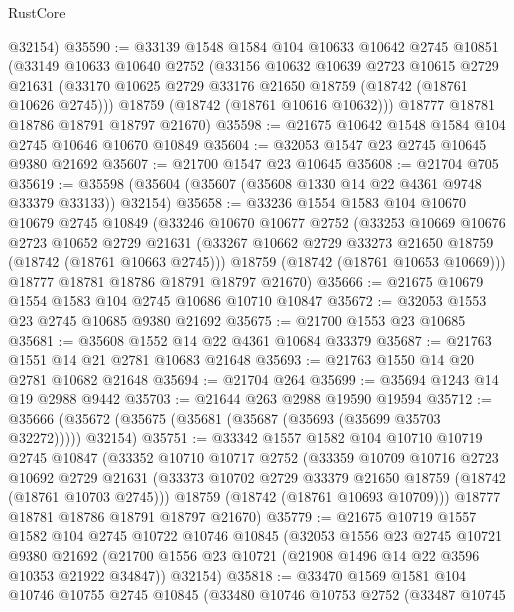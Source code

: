 \begin{lexlean}{RustCore}
\begin{coremodule}
      @32154)
@35590 := @33139
    @1548
    @1584
    @104
    @10633
    @10642
    @2745
    @10851
    (@33149
      @10633
      @10640
      @2752
      (@33156
        @10632
        @10639
        @2723
        @10615
        @2729
        @21631
        (@33170 @10625 @2729 @33176 @21650 @18759 (@18742 (@18761 @10626 @2745)))
        @18759
        (@18742 (@18761 @10616 @10632)))
      @18777
      @18781
      @18786
      @18791
      @18797
      @21670)
@35598 := @21675 @10642 @1548 @1584 @104 @2745 @10646 @10670 @10849
@35604 := @32053 @1547 @23 @2745 @10645 @9380 @21692
@35607 := @21700 @1547 @23 @10645
@35608 := @21704 @705
@35619 := @35598 (@35604 (@35607 (@35608 @1330 @14 @22 @4361 @9748 @33379 @33133)) @32154)
@35658 := @33236
    @1554
    @1583
    @104
    @10670
    @10679
    @2745
    @10849
    (@33246
      @10670
      @10677
      @2752
      (@33253
        @10669
        @10676
        @2723
        @10652
        @2729
        @21631
        (@33267 @10662 @2729 @33273 @21650 @18759 (@18742 (@18761 @10663 @2745)))
        @18759
        (@18742 (@18761 @10653 @10669)))
      @18777
      @18781
      @18786
      @18791
      @18797
      @21670)
@35666 := @21675 @10679 @1554 @1583 @104 @2745 @10686 @10710 @10847
@35672 := @32053 @1553 @23 @2745 @10685 @9380 @21692
@35675 := @21700 @1553 @23 @10685
@35681 := @35608 @1552 @14 @22 @4361 @10684 @33379
@35687 := @21763 @1551 @14 @21 @2781 @10683 @21648
@35693 := @21763 @1550 @14 @20 @2781 @10682 @21648
@35694 := @21704 @264
@35699 := @35694 @1243 @14 @19 @2988 @9442
@35703 := @21644 @263 @2988 @19590 @19594
@35712 := @35666 (@35672 (@35675 (@35681 (@35687 (@35693 (@35699 @35703 @32272))))) @32154)
@35751 := @33342
    @1557
    @1582
    @104
    @10710
    @10719
    @2745
    @10847
    (@33352
      @10710
      @10717
      @2752
      (@33359
        @10709
        @10716
        @2723
        @10692
        @2729
        @21631
        (@33373 @10702 @2729 @33379 @21650 @18759 (@18742 (@18761 @10703 @2745)))
        @18759
        (@18742 (@18761 @10693 @10709)))
      @18777
      @18781
      @18786
      @18791
      @18797
      @21670)
@35779 := @21675
    @10719
    @1557
    @1582
    @104
    @2745
    @10722
    @10746
    @10845
    (@32053
      @1556
      @23
      @2745
      @10721
      @9380
      @21692
      (@21700 @1556 @23 @10721 (@21908 @1496 @14 @22 @3596 @10353 @21922 @34847))
      @32154)
@35818 := @33470
    @1569
    @1581
    @104
    @10746
    @10755
    @2745
    @10845
    (@33480
      @10746
      @10753
      @2752
      (@33487
        @10745

\end{coremodule}
\end{lexlean}
